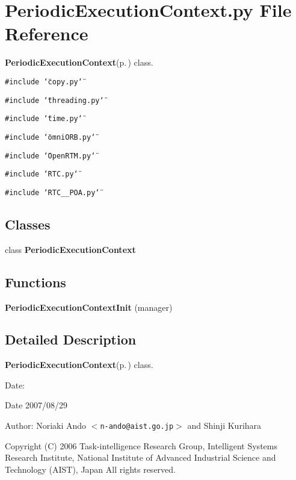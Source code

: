 \section{Periodic\-Execution\-Context.py File Reference}
\label{PeriodicExecutionContext_8py}
{\bf Periodic\-Execution\-Context}{\rm (p.\,\pageref{classPeriodicExecutionContext})} class. 

{\tt \#include \char`\"{}copy.py\char`\"{}}\par
{\tt \#include \char`\"{}threading.py\char`\"{}}\par
{\tt \#include \char`\"{}time.py\char`\"{}}\par
{\tt \#include \char`\"{}omni\-ORB.py\char`\"{}}\par
{\tt \#include \char`\"{}Open\-RTM.py\char`\"{}}\par
{\tt \#include \char`\"{}RTC.py\char`\"{}}\par
{\tt \#include \char`\"{}RTC\_\-\_\-POA.py\char`\"{}}\par
\subsection*{Classes}
\begin{CompactItemize}
\item 
class {\bf Periodic\-Execution\-Context}
\end{CompactItemize}
\subsection*{Functions}
\begin{CompactItemize}
\item 
{\bf Periodic\-Execution\-Context\-Init} (manager)
\end{CompactItemize}


\subsection{Detailed Description}
{\bf Periodic\-Execution\-Context}{\rm (p.\,\pageref{classPeriodicExecutionContext})} class. 

\begin{Desc}
\item[Date:]\begin{Desc}
\item[Date]2007/08/29\end{Desc}
\end{Desc}
\begin{Desc}
\item[Author:]Noriaki Ando $<${\tt n-ando@aist.go.jp}$>$ and Shinji Kurihara\end{Desc}
Copyright (C) 2006 Task-intelligence Research Group, Intelligent Systems Research Institute, National Institute of Advanced Industrial Science and Technology (AIST), Japan All rights reserved.

